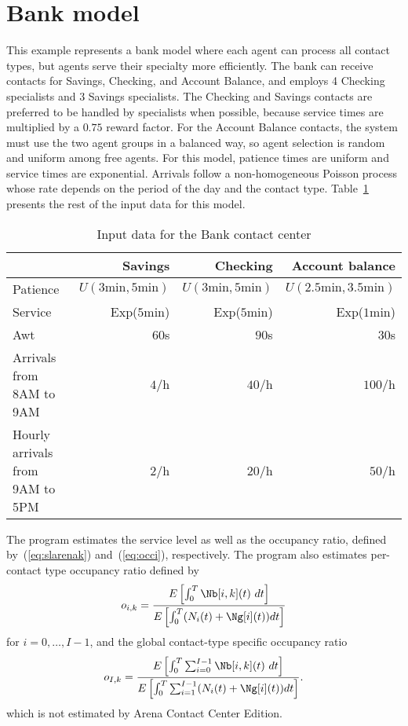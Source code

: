 \section{Bank model}
\label{sec:Bank}

This example represents a bank model where each agent can process all
contact
types, but agents serve their specialty more efficiently.  The bank
can receive contacts for Savings, Checking, and Account Balance,
and employs 4 Checking specialists and
3 Savings specialists.  The Checking and Savings contacts are
preferred to be handled by specialists when possible, because service
times are multiplied by a $0.75$ reward factor.  For the Account
Balance contacts, the system must use the two agent groups in a
balanced way, so agent selection is random and uniform among free
agents.  For this model, patience times are uniform and
service times are exponential.  Arrivals follow a
non-homogeneous Poisson process whose rate depends on the period of the
day and the contact type.
Table~\ref{tab:Bank} presents the rest of the
input data for this model.

\begin{table}[htb]
  \caption{Input data for the Bank contact center}
  \label{tab:Bank}
  \centering
  \begin{tabular}{|l|rrr|}\hline
    &Savings&Checking&Account balance\\\hline
    Patience&$U(3\mathrm{min},5\mathrm{min})$&$U(3\mathrm{min},5\mathrm{min})$&$U(2.5\mathrm{min},3.5\mathrm{min})$\\
    Service&Exp($5\mathrm{min}$)&Exp($5\mathrm{min}$)&Exp($1\mathrm{min}$)\\
    Awt&$60$s&$90$s&$30$s\\
    Arrivals from 8AM to 9AM&$4/$h&$40/$h&$100/$h\\
    Hourly arrivals from 9AM to 5PM&$2/$h&$20/$h&$50/$h\\\hline
  \end{tabular}
\end{table}

The program estimates the service level as
well as the occupancy ratio, defined by~(\ref{eq:slarenak})
and~(\ref{eq:occi}), respectively.
The program also estimates per-contact type occupancy ratio defined by
\begin{equation}
o_{i,k}=\frac{E\left[\int_0^T \Nb[i, k](t)\
    dt\right]}{E\left[\int_0^T (N_i(t) + \Ng[i](t)) dt\right]}
\end{equation}
for $i=0,\ldots,I-1$,
and the global contact-type specific occupancy ratio
\[o_{I,k}=\frac{E\left[\int_0^T \sum_{i=0}^{I-1}\Nb[i, k](t)\
    dt\right]}{E\left[\int_0^T \sum_{i=1}^{I-1}(N_i(t) + \Ng[i](t)) dt\right]}.\]
which is
not estimated by Arena Contact Center Edition.

